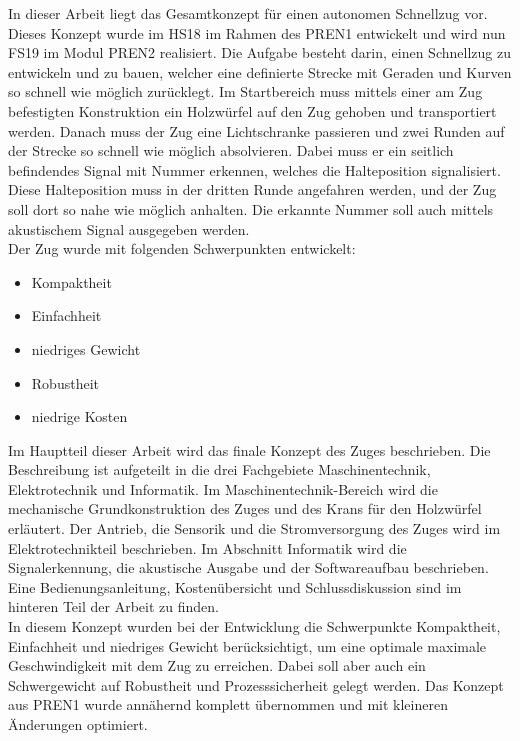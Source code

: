 \documentclass[../../main.tex]{subfiles}
\begin{document}
In dieser Arbeit liegt das Gesamtkonzept für einen autonomen Schnellzug vor. Dieses Konzept wurde im HS18 im Rahmen des PREN1 entwickelt und wird nun FS19 im Modul PREN2 realisiert. Die Aufgabe besteht darin, einen Schnellzug zu entwickeln und zu bauen, welcher eine definierte Strecke mit Geraden und Kurven so schnell wie möglich zurücklegt. Im Startbereich muss mittels einer am Zug befestigten Konstruktion ein Holzwürfel auf den Zug gehoben und transportiert werden. Danach muss der Zug eine Lichtschranke passieren und zwei Runden auf der Strecke so schnell wie möglich absolvieren. Dabei muss er ein seitlich befindendes Signal mit Nummer erkennen, welches die Halteposition signalisiert. Diese Halteposition muss in der dritten Runde angefahren werden, und der Zug soll dort so nahe wie möglich anhalten. Die erkannte Nummer soll auch mittels akustischem Signal ausgegeben werden. \\
Der Zug wurde mit folgenden Schwerpunkten entwickelt:
\begin{itemize}
    \item Kompaktheit
    \item Einfachheit
    \item niedriges Gewicht
    \item Robustheit
    \item niedrige Kosten
\end{itemize}
Im Hauptteil dieser Arbeit wird das finale Konzept des Zuges beschrieben. Die Beschreibung ist aufgeteilt in die drei
Fachgebiete Maschinentechnik, Elektrotechnik und Informatik. Im Maschinentechnik-Bereich wird die mechanische
Grundkonstruktion des Zuges und des Krans für den Holzwürfel erläutert. Der Antrieb, die Sensorik und die
Stromversorgung des Zuges wird im Elektrotechnikteil beschrieben. Im Abschnitt Informatik wird die Signalerkennung, die
akustische Ausgabe und der Softwareaufbau beschrieben. Eine Bedienungsanleitung, Kostenübersicht und Schlussdiskussion sind im hinteren Teil der Arbeit zu finden.\\
In diesem Konzept wurden bei der Entwicklung die Schwerpunkte Kompaktheit, Einfachheit und niedriges Gewicht berücksichtigt, um eine optimale maximale Geschwindigkeit mit dem Zug zu erreichen. Dabei soll aber auch ein Schwergewicht auf Robustheit und Prozesssicherheit gelegt werden. Das Konzept aus PREN1 wurde annähernd komplett übernommen und mit kleineren Änderungen optimiert.
\end{document}
